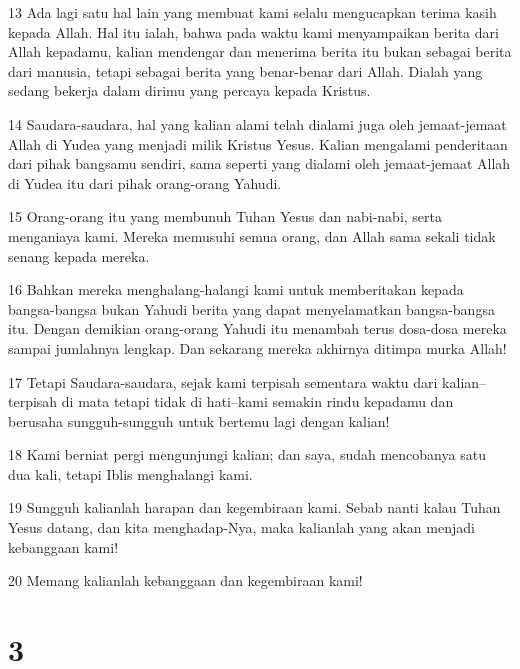 \par 13 Ada lagi satu hal lain yang membuat kami selalu mengucapkan terima kasih kepada Allah. Hal itu ialah, bahwa pada waktu kami menyampaikan berita dari Allah kepadamu, kalian mendengar dan menerima berita itu bukan sebagai berita dari manusia, tetapi sebagai berita yang benar-benar dari Allah. Dialah yang sedang bekerja dalam dirimu yang percaya kepada Kristus.
\par 14 Saudara-saudara, hal yang kalian alami telah dialami juga oleh jemaat-jemaat Allah di Yudea yang menjadi milik Kristus Yesus. Kalian mengalami penderitaan dari pihak bangsamu sendiri, sama seperti yang dialami oleh jemaat-jemaat Allah di Yudea itu dari pihak orang-orang Yahudi.
\par 15 Orang-orang itu yang membunuh Tuhan Yesus dan nabi-nabi, serta menganiaya kami. Mereka memusuhi semua orang, dan Allah sama sekali tidak senang kepada mereka.
\par 16 Bahkan mereka menghalang-halangi kami untuk memberitakan kepada bangsa-bangsa bukan Yahudi berita yang dapat menyelamatkan bangsa-bangsa itu. Dengan demikian orang-orang Yahudi itu menambah terus dosa-dosa mereka sampai jumlahnya lengkap. Dan sekarang mereka akhirnya ditimpa murka Allah!
\par 17 Tetapi Saudara-saudara, sejak kami terpisah sementara waktu dari kalian--terpisah di mata tetapi tidak di hati--kami semakin rindu kepadamu dan berusaha sungguh-sungguh untuk bertemu lagi dengan kalian!
\par 18 Kami berniat pergi mengunjungi kalian; dan saya, sudah mencobanya satu dua kali, tetapi Iblis menghalangi kami.
\par 19 Sungguh kalianlah harapan dan kegembiraan kami. Sebab nanti kalau Tuhan Yesus datang, dan kita menghadap-Nya, maka kalianlah yang akan menjadi kebanggaan kami!
\par 20 Memang kalianlah kebanggaan dan kegembiraan kami!

\chapter{3}

